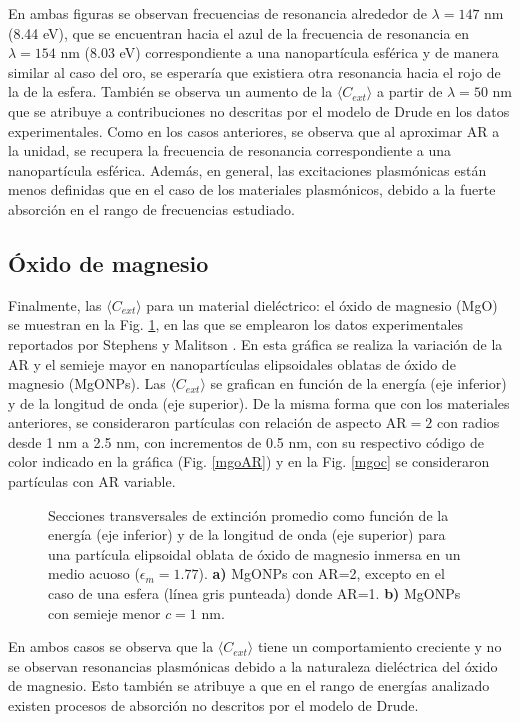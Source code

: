 En ambas figuras se observan frecuencias de resonancia alrededor de $\lambda=147$ nm (8.44 eV), que se encuentran hacia el azul de la frecuencia de resonancia en $\lambda=154$ nm (8.03 eV) correspondiente a una nanopartícula esférica y de manera similar al caso del oro, se esperaría que existiera otra resonancia hacia el rojo de la de la esfera. También se observa un aumento de la $\langle C_{ext}\rangle$ a partir de $\lambda=50$ nm  que se atribuye a contribuciones no descritas por el modelo de Drude en los datos experimentales. Como en los casos anteriores, se observa que al aproximar AR a la unidad, se recupera la frecuencia de resonancia correspondiente a una nanopartícula esférica. Además, en general, las excitaciones plasmónicas están menos definidas que en el caso de los materiales plasmónicos, debido a la fuerte absorción en el rango de frecuencias estudiado.



\subsection*{Óxido de magnesio}
Finalmente, las $\langle C_{ext}\rangle$ para un material dieléctrico: el óxido de magnesio (MgO) se muestran en la Fig. \ref{mgo}, en las que se emplearon los datos experimentales reportados por Stephens y Malitson \cite{MgO}. En esta gráfica se realiza la variación de la AR y el semieje mayor en nanopartículas elipsoidales oblatas de óxido de magnesio (MgONPs). Las $\langle C_{ext}\rangle$ se grafican en función de la energía (eje inferior) y de la longitud de onda (eje superior). De la misma forma que con los materiales anteriores, se consideraron partículas con relación de aspecto AR$=2$ con radios desde 1  nm a 2.5 nm, con incrementos de 0.5 nm, con su respectivo código de color indicado en la gráfica (Fig. \ref{mgoAR}) y en la Fig. \ref{mgoc} se consideraron partículas con AR variable. 

\begin{figure}[H]
	\quad%
	\caption{Secciones transversales de extinción promedio como función de la energía (eje inferior) y de la longitud de onda (eje superior) para una partícula elipsoidal oblata de óxido de magnesio inmersa en un medio acuoso ($\epsilon_m=1.77$). \textbf{a)} MgONPs con AR=2, excepto en el caso de una esfera (línea gris punteada) donde AR=1. \textbf{b)}  MgONPs con semieje menor $c=1$ nm.}\label{mgo}
\end{figure}

En ambos casos se observa que la $\langle C_{ext}\rangle$ tiene un comportamiento creciente y no se observan resonancias plasmónicas debido a la naturaleza dieléctrica del óxido de magnesio. Esto también se atribuye a que en el rango de energías analizado existen procesos de absorción no descritos por el modelo de Drude.








